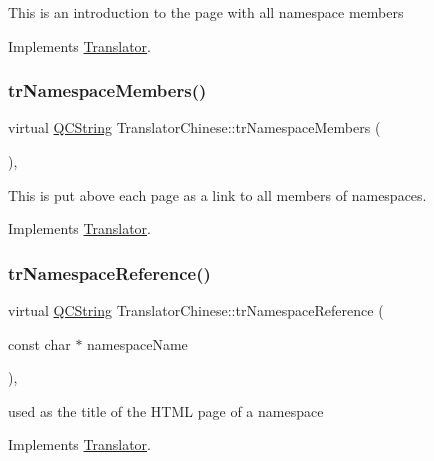 This is an introduction to the page with all namespace members 

Implements \mbox{\hyperlink{class_translator}{Translator}}.

\mbox{\label{class_translator_chinese_a2453e0ff35e4589c30dbd5f10b6766d9}} 
\subsubsection{\texorpdfstring{trNamespaceMembers()}{trNamespaceMembers()}}
{\footnotesize\ttfamily virtual \mbox{\hyperlink{class_q_c_string}{Q\+C\+String}} Translator\+Chinese\+::tr\+Namespace\+Members (\begin{DoxyParamCaption}{ }\end{DoxyParamCaption})\hspace{0.3cm}{\ttfamily [inline]}, {\ttfamily [virtual]}}

This is put above each page as a link to all members of namespaces. 

Implements \mbox{\hyperlink{class_translator}{Translator}}.

\mbox{\label{class_translator_chinese_a3eb1d572493ec42ec5e807c237282d10}} 
\subsubsection{\texorpdfstring{trNamespaceReference()}{trNamespaceReference()}}
{\footnotesize\ttfamily virtual \mbox{\hyperlink{class_q_c_string}{Q\+C\+String}} Translator\+Chinese\+::tr\+Namespace\+Reference (\begin{DoxyParamCaption}\item[{const char $\ast$}]{namespace\+Name }\end{DoxyParamCaption})\hspace{0.3cm}{\ttfamily [inline]}, {\ttfamily [virtual]}}

used as the title of the H\+T\+ML page of a namespace 

Implements \mbox{\hyperlink{class_translator}{Translator}}.


